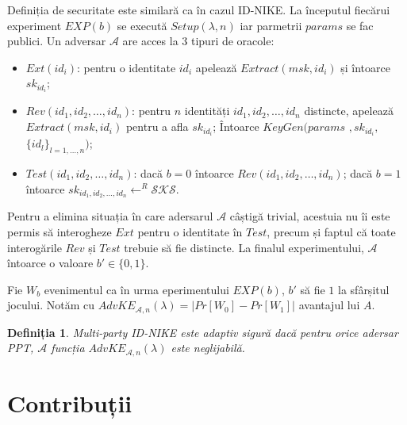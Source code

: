 \documentclass[oneside, 12pt]{book}
\newtheorem{definitie}{\textbf{Definiția}}[section]
\begin{document}
Definiția de securitate este similară ca în cazul ID-NIKE. La începutul fiecărui experiment $EXP(b)$ se execută $Setup(\lambda, n)$ iar parmetrii $params$ se fac publici. Un adversar $\mathcal{A}$ are acces la $3$ tipuri de oracole:
\begin{itemize}
	\item $Ext(id_i)$: pentru o identitate $id_i$ apelează $Extract(msk,id_i)$ și întoarce $sk_{id_i}$;
	\item $Rev(id_1, id_2, \dots, id_n)$: pentru $n$ identități $id_1, id_2, \dots, id_n$ distincte, apelează $Extract(msk, id_i)$ pentru a afla $sk_{id_i}$; Întoarce $KeyGen(params$ $,sk_{id_i},$ $\{id_l\}_{l=1,\dots,n})$;
	\item $Test(id_1, id_2, \dots, id_n)$: dacă $b = 0$ întoarce $Rev(id_1, id_2, \dots, id_n)$; dacă $b = 1$ întoarce $sk_{id_1, id_2, \dots, id_n} \leftarrow^R \mathcal{SKS}$.
\end{itemize}

Pentru a elimina situația în care adersarul $\mathcal{A}$ câștigă trivial, acestuia nu îi este permis să interogheze $Ext$ pentru o identitate în $Test$, precum și faptul că toate interogările $Rev$ și $Test$ trebuie să fie distincte. La finalul experimentului, $\mathcal{A}$ întoarce o valoare $b' \in \{0, 1\}$.

Fie $W_b$ evenimentul ca în urma eperimentului $EXP(b)$, $b'$ să fie $1$ la sfârșitul jocului. Notăm cu $AdvKE_{\mathcal{A}, n}(\lambda) = |Pr[W_0] - Pr[W_1]|$ avantajul lui $A$.


\begin{definitie}
	Multi-party ID-NIKE este adaptiv sigură dacă pentru orice adersar PPT, $\mathcal{A}$ funcția $AdvKE_{\mathcal{A},n}(\lambda)$ este neglijabilă.
\end{definitie}

\section{Contribuții}
\label{sec:multi-party-contributions}
\end{document}
